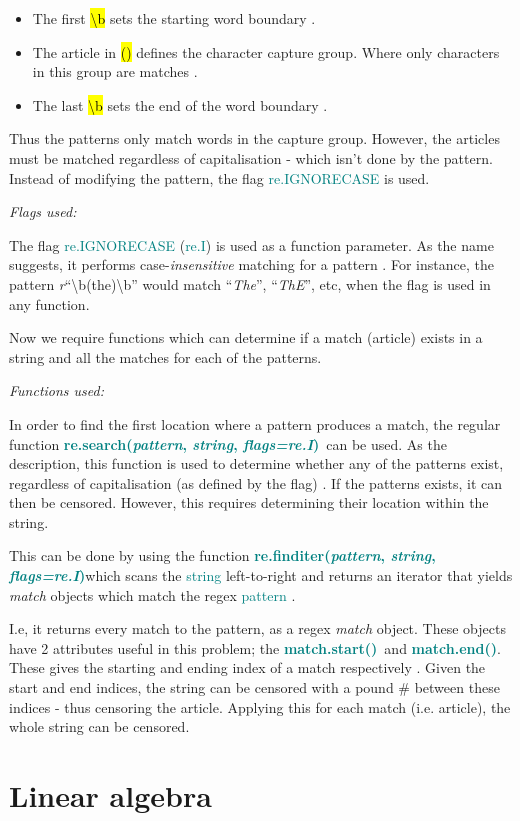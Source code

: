 \documentclass[a4paper]{article}
\newcommand \search {\textcolor{teal}{\textbf{re.search(\emph{pattern}, \emph{string}, \emph{flags=re.I})}}}
\newcommand \finditer {\textcolor{teal}{\textbf{re.finditer(\emph{pattern}, \emph{string}, \emph{flags=re.I})}}}
\newcommand \matchStart {\textcolor{teal}{\textbf{match.start()}}}
\newcommand \matchEnd {\textcolor{teal}{\textbf{match.end()}}}
\begin{document}
\begin{itemize}
    \item The first \hl{\textbackslash b} sets the starting word boundary \autocite{a2022_re}.
    \item The article in \hl{()} defines the character capture group. Where only characters in this group are matches \autocite{a2022_re}.
    \item The last \hl{\textbackslash b} sets the end of the word boundary \autocite{a2022_re}.
\end{itemize}
Thus the patterns only match words in the capture group. However, the articles must be matched regardless of capitalisation - which isn't done by the pattern. Instead of modifying the pattern, the flag \textcolor{teal}{re.IGNORECASE} is used.
\vspace{5mm}


\noindent
\emph{Flags used:}
\vspace{2mm}

\noindent
The flag \textcolor{teal}{re.IGNORECASE} (\textcolor{teal}{re.I}) is used as a function parameter. As the name suggests, it performs case-\emph{insensitive} matching for a pattern \autocite{a2022_re}. For instance, the pattern \emph{r}\enquote{\textbackslash b(the)\textbackslash b} would match \enquote{\emph{The}}, \enquote{\emph{ThE}}, etc, when the flag is used in any function.

Now we require functions which can determine if a match (article) exists in a string and all the matches for each of the patterns.
\vspace{5mm}

\noindent
\emph{Functions used:}
\vspace{2mm}

\noindent
In order to find the first location where a pattern produces a match, the regular function \search \ can be used. As the description, this function is used to determine whether any of the patterns exist, regardless of capitalisation (as defined by the flag) \autocite{a2022_re}. If the patterns exists, it can then be censored. However, this requires determining their location within the string.
\vspace{2mm}

\noindent
This can be done by using the function \finditer which scans the \textcolor{teal}{string} left-to-right and returns an iterator that yields \emph{match} objects which match the regex \textcolor{teal}{pattern} \autocite{a2022_re}.

I.e, it returns every match to the pattern, as a regex \emph{match} object. These objects have 2 attributes useful in this problem; the \matchStart \ and \matchEnd. These gives the starting and ending index of a match respectively \autocite{a2022_re}. Given the start and end indices, the string can be censored with a pound \# between these indices - thus censoring the article. Applying this for each match (i.e. article), the whole string can be censored.


\section{Linear algebra}

\printbibliography
\end{document}
